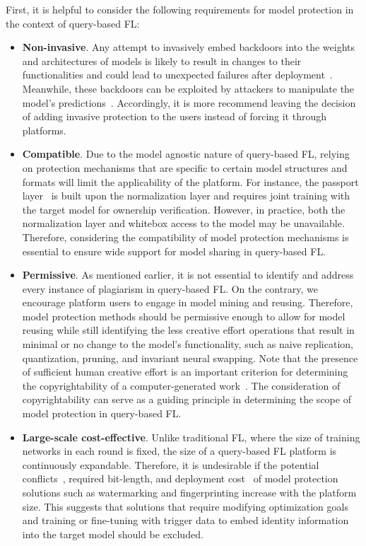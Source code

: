 \documentclass[journal]{IEEEtran}
\begin{document}
First, it is helpful to consider the following requirements for model protection in the context of query-based FL:
\begin{itemize}
  \item \textbf{Non-invasive}. Any attempt to invasively embed backdoors into the weights and architectures of models is likely to result in changes to their functionalities and could lead to unexpected failures after deployment~\cite{chen2022copy}. 
  Meanwhile, these backdoors can be exploited by attackers to manipulate the model's predictions~\cite{li2022untargeted}.
  Accordingly, it is more recommend leaving the decision of adding invasive protection to the users instead of forcing it through platforms.
  
  \item \textbf{Compatible}. %
  Due to the model agnostic nature of query-based FL, relying on protection mechanisms that are specific to certain model structures and formats will limit the applicability of the platform.
  For instance, the passport layer~\cite{zhang2020passport} is built upon the normalization layer and requires joint training with the target model for ownership verification.
  However, in practice, both the normalization layer and whitebox access to the model may be unavailable.
  Therefore, considering the compatibility of model protection mechanisms is essential to ensure wide support for model sharing in query-based FL.

  \item \textbf{Permissive}. %
  As mentioned earlier, it is not essential to identify and address every instance of plagiarism in query-based FL. 
  On the contrary, we encourage platform users to engage in model mining and reusing. 
  Therefore, model protection methods should be permissive enough to allow for model reusing while still identifying the less creative effort operations that result in minimal or no change to the model's functionality, such as naive replication, quantization, pruning, and invariant neural swapping.
  Note that the presence of sufficient human creative effort is an important criterion for determining the copyrightability of a computer-generated work~\cite{national1979final}.
  The consideration of copyrightability can serve as a guiding principle in determining the scope of model protection in query-based FL.

  \item \textbf{Large-scale cost-effective}.
  Unlike traditional FL, where the size of training networks in each round is fixed, the size of a query-based FL platform is continuously expandable. 
  Therefore, it is undesirable if the potential conflicts~\cite{li2023fedipr}, required bit-length, and deployment cost~\cite{uchida2017embedding, darvish2019deepsigns} of model protection solutions such as watermarking and fingerprinting increase with the platform size.
  This suggests that solutions that require modifying optimization goals and training or fine-tuning with trigger data to embed identity information into the target model should be excluded.

\end{itemize}
\end{document}
